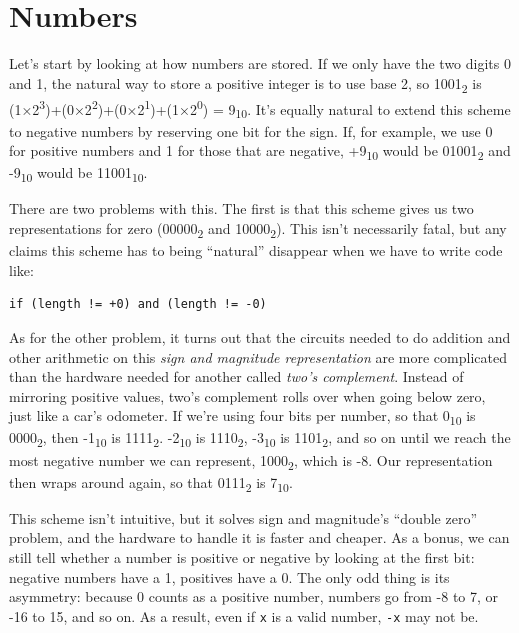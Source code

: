\documentclass[]{book}
\newcommand{\gdef}[2]{\emph{#2}}
\begin{document}
\section{Numbers}

Let's start by looking at how numbers are stored. If we only have the
two digits 0 and 1, the natural way to store a positive integer is to
use base 2, so 1001\textsubscript{2} is
(1×2\textsuperscript{3})+(0×2\textsuperscript{2})+(0×2\textsuperscript{1})+(1×2\textsuperscript{0})
= 9\textsubscript{10}. It's equally natural to extend this scheme to
negative numbers by reserving one bit for the sign. If, for example, we
use 0 for positive numbers and 1 for those that are negative,
+9\textsubscript{10} would be 01001\textsubscript{2} and
-9\textsubscript{10} would be 11001\textsubscript{10}.

There are two problems with this. The first is that this scheme gives us
two representations for zero (00000\textsubscript{2} and
10000\textsubscript{2}). This isn't necessarily fatal, but any claims
this scheme has to being ``natural'' disappear when we have to write
code like:

\begin{verbatim}
if (length != +0) and (length != -0)
\end{verbatim}

As for the other problem, it turns out that the circuits needed to do
addition and other arithmetic on this
\gdef{g:sign-and-magnitude}{sign and magnitude representation} are
more complicated than the hardware needed for another called
\gdef{g:twos-complement}{two's complement}. Instead of mirroring
positive values, two's complement rolls over when going below zero, just
like a car's odometer. If we're using four bits per number, so that
0\textsubscript{10} is 0000\textsubscript{2}, then -1\textsubscript{10}
is 1111\textsubscript{2}. -2\textsubscript{10} is 1110\textsubscript{2},
-3\textsubscript{10} is 1101\textsubscript{2}, and so on until we reach
the most negative number we can represent, 1000\textsubscript{2}, which
is -8. Our representation then wraps around again, so that
0111\textsubscript{2} is 7\textsubscript{10}.

This scheme isn't intuitive, but it solves sign and magnitude's ``double
zero'' problem, and the hardware to handle it is faster and cheaper. As
a bonus, we can still tell whether a number is positive or negative by
looking at the first bit: negative numbers have a 1, positives have a 0.
The only odd thing is its asymmetry: because 0 counts as a positive
number, numbers go from -8 to 7, or -16 to 15, and so on. As a result,
even if \texttt{x} is a valid number, \texttt{-x} may not be.
\end{document}
